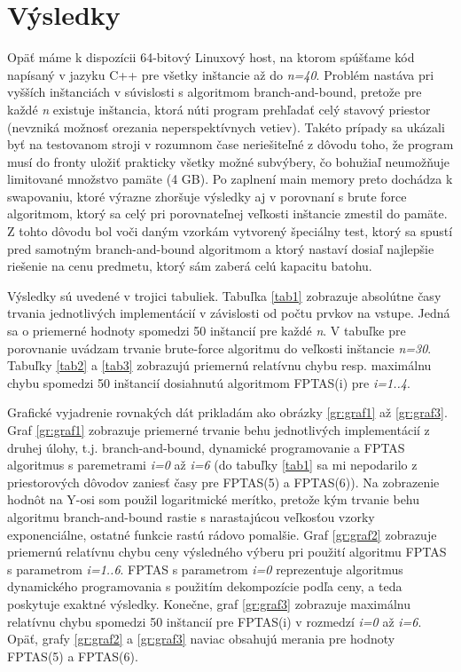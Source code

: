 \documentclass[slovak]{article}
\begin{document}
\section{Výsledky}

Opäť máme k dispozícii 64-bitový Linuxový host, na ktorom spúšťame kód napísaný v jazyku C++ pre všetky inštancie až do \emph{n=40}. Problém nastáva pri vyšších inštanciách v súvislosti s algoritmom branch-and-bound, pretože pre každé \emph{n} existuje inštancia, ktorá núti program prehľadať celý stavový priestor (nevzniká možnosť orezania neperspektívnych vetiev). Takéto prípady sa ukázali byť na testovanom stroji v rozumnom čase neriešiteľné z dôvodu toho, že program musí do fronty uložiť prakticky všetky možné subvýbery, čo bohužiaľ neumožňuje limitované množstvo pamäte (4 GB). Po zaplnení main memory preto dochádza k swapovaniu, ktoré výrazne zhoršuje výsledky aj v porovnaní s brute force algoritmom, ktorý sa celý pri porovnateľnej veľkosti inštancie zmestil do pamäte. Z tohto dôvodu bol voči daným vzorkám vytvorený špeciálny test, ktorý sa spustí pred samotným branch-and-bound algoritmom a ktorý nastaví dosiaľ najlepšie riešenie na cenu predmetu, ktorý sám zaberá celú kapacitu batohu.

Výsledky sú uvedené v trojici tabuliek. Tabuľka \ref{tab1} zobrazuje absolútne časy trvania jednotlivých implementácií v závislosti od počtu prvkov na vstupe. Jedná sa o priemerné hodnoty spomedzi 50 inštancií pre každé \emph{n}. V tabuľke pre porovnanie uvádzam trvanie brute-force algoritmu do veľkosti inštancie \emph{n=30}. Tabuľky \ref{tab2} a \ref{tab3} zobrazujú priemernú relatívnu chybu resp. maximálnu chybu spomedzi 50 inštancií dosiahnutú algoritmom FPTAS(i) pre \emph{i=1..4}.

Grafické vyjadrenie rovnakých dát prikladám ako obrázky \ref{gr:graf1} až \ref{gr:graf3}. Graf \ref{gr:graf1} zobrazuje priemerné trvanie behu jednotlivých implementácií z druhej úlohy, t.j. branch-and-bound, dynamické programovanie a FPTAS algoritmus s paremetrami \emph{i=0} až \emph{i=6} (do tabuľky \ref{tab1} sa mi nepodarilo z priestorových dôvodov zaniesť časy pre FPTAS(5) a FPTAS(6)). Na zobrazenie hodnôt na Y-osi som použil logaritmické merítko, pretože kým trvanie behu algoritmu branch-and-bound rastie s narastajúcou veľkosťou vzorky exponenciálne, ostatné funkcie rastú rádovo pomalšie. Graf \ref{gr:graf2} zobrazuje priemernú relatívnu chybu ceny výsledného výberu pri použití algoritmu FPTAS s parametrom \emph{i=1..6}. FPTAS s parametrom \emph{i=0} reprezentuje algoritmus dynamického programovania s použitím dekompozície podľa ceny, a teda poskytuje exaktné výsledky. Konečne, graf \ref{gr:graf3} zobrazuje maximálnu relatívnu chybu spomedzi 50 inštancií pre FPTAS(i) v rozmedzí \emph{i=0} až \emph{i=6}. Opäť, grafy \ref{gr:graf2} a \ref{gr:graf3} naviac obsahujú merania pre hodnoty FPTAS(5) a FPTAS(6).
\end{document}
